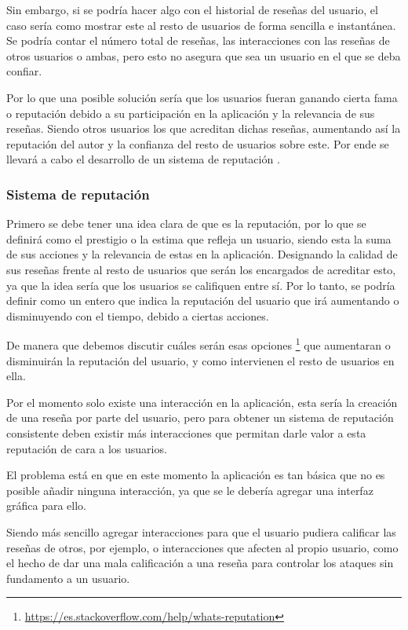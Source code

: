 Sin embargo, si se podría hacer algo con el historial de reseñas del usuario, el caso sería como mostrar este al 
resto de usuarios de forma sencilla e instantánea. Se podría contar el número total de reseñas, las interacciones 
con las reseñas de otros usuarios o ambas, pero esto no asegura que sea un usuario en el que se deba confiar. 

Por lo que una posible solución sería que los usuarios fueran ganando cierta fama o reputación debido a su 
participación en la aplicación y la relevancia de sus reseñas. Siendo otros usuarios los que acreditan dichas 
reseñas, aumentando así la reputación del autor y la confianza del resto de usuarios sobre este. Por ende se llevará 
a cabo el desarrollo de un sistema de reputación \cite{10.1007/978-3-540-74810-6_8}.

\subsubsection{Sistema de reputación}

Primero se debe tener una idea clara de que es la reputación, por lo que se definirá como el prestigio o la estima 
que refleja un usuario, siendo esta la suma de sus acciones y la relevancia de estas en la aplicación. Designando la 
calidad de sus reseñas frente al resto de usuarios que serán los encargados de acreditar esto, ya que la idea sería 
que los usuarios se califiquen entre sí. Por lo tanto, se podría definir como un entero que indica la reputación del 
usuario que irá aumentando o disminuyendo con el tiempo, debido a ciertas acciones.

De manera que debemos discutir cuáles serán esas opciones \footnote{\url{https://es.stackoverflow.com/help/whats-reputation}} que aumentaran o disminuirán la reputación del usuario, y como intervienen el resto de usuarios en 
ella. 

Por el momento solo existe una interacción en la aplicación, esta sería la creación de una reseña por parte del 
usuario, pero para obtener un sistema de reputación consistente deben existir más interacciones que permitan darle 
valor a esta reputación de cara a los usuarios. 

El problema está en que en este momento la aplicación es tan básica que no es posible añadir ninguna interacción, ya 
que se le debería agregar una interfaz gráfica para ello. 

Siendo más sencillo agregar interacciones para que el usuario pudiera calificar las reseñas de otros, por ejemplo, o 
interacciones que afecten al propio usuario, como el hecho de dar una mala calificación a una reseña para controlar 
los ataques sin fundamento a un usuario.
